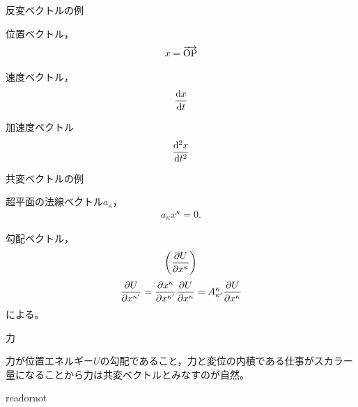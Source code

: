 \documentclass[uplatex]{jsarticle}
\begin{document}
\sukima {}\par
\noindent\textbullet\; 反変ベクトルの例\par
\qquad  
\begin{minipage}[t]{0.15\columnwidth}
  位置ベクトル，
  \begin{align*}
    x = \overrightarrow{\mathrm{OP}}
  \end{align*}
\end{minipage}
\vspace{0.05\baselineskip}
\begin{minipage}[t]{0.15\columnwidth}
  速度ベクトル，
  \begin{align*}
    \dfrac{\mathrm{d}x}{\mathrm{d}t}
  \end{align*}
\end{minipage}
\vspace{0.05\baselineskip}
\begin{minipage}[t]{0.15\columnwidth}
  加速度ベクトル
  \begin{align*}
    \dfrac{\mathrm{d}^{2}x}{\mathrm{d}t^{2}}
  \end{align*} 
\end{minipage}

\sukima\noindent\textbullet\; 共変ベクトルの例\par
\qquad  
\begin{minipage}[t]{0.3\columnwidth}
  超平面の法線ベクトル$a_{\kappa}$，
  \begin{align*}
    a_{\kappa} x^{\kappa} = 0.
  \end{align*}
\end{minipage}
\vspace{0.05\baselineskip}
\begin{minipage}[t]{0.3\columnwidth}
  勾配ベクトル，
  \begin{align*}
    \left( \dfrac{\partial U}{\partial x^{\kappa}} \right)
  \end{align*}
  {\footnotesize
  \begin{align*}
    \dfrac{\partial U}{\partial x^{\kappa^{\prime}}} = \dfrac{\partial x^{\kappa}}{\partial x^{\kappa^{\prime}}} \dfrac{\partial U}{\partial x^{\kappa}} = A_{\kappa^{\prime}}^{\kappa} \dfrac{\partial U}{\partial x^{\kappa}}
  \end{align*}
  による。
  }
\end{minipage}
\vspace{0.05\baselineskip}
\begin{minipage}[t]{0.3\columnwidth}
  力\par
  {\footnotesize
  力が位置エネルギー$U$の勾配であること，力と変位の内積である仕事がスカラー量になることから力は共変ベクトルとみなすのが自然。
  }
\end{minipage}

\expandafter\ifx\csname readornot\endcsname\relax
  
\end{document}
